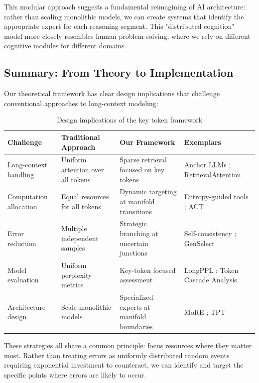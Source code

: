 \documentclass{article}
\begin{document}
This modular approach suggests a fundamental reimagining of AI architecture: rather than scaling monolithic models, we can create systems that identify the appropriate expert for each reasoning segment. This "distributed cognition" model more closely resembles human problem-solving, where we rely on different cognitive modules for different domains.

\subsection{Summary: From Theory to Implementation}

Our theoretical framework has clear design implications that challenge conventional approaches to long-context modeling:

\begin{table}[ht]
\caption{Design implications of the key token framework}
\centering
\small
\begin{tabular}{p{2.6cm}p{3cm}p{3cm}p{3.5cm}}
\toprule
\textbf{Challenge} & \textbf{Traditional Approach} & \textbf{Our Framework} & \textbf{Exemplars} \\
\midrule
Long-context handling & Uniform attention over all tokens & Sparse retrieval focused on key tokens & Anchor LLMs \citep{pang2024anchor}; RetrievalAttention \citep{liu2024retrieval} \\
\midrule
Computation allocation & Equal resources for all tokens & Dynamic targeting at manifold transitions & Entropy-guided tools \citep{moshkov2025aimo}; ACT \citep{xin2023adaptive} \\
\midrule
Error reduction & Multiple independent samples & Strategic branching at uncertain junctions & Self-consistency \citep{wang2023self}; GenSelect \citep{moshkov2025aimo} \\
\midrule
Model evaluation & Uniform perplexity metrics & Key-token focused assessment & LongPPL \citep{fang2024what}; Token Cascade Analysis \citep{nistar2024token} \\
\midrule
Architecture design & Scale monolithic models & Specialized experts at manifold boundaries & MoRE \citep{si2023mixture}; TPT \citep{costello2025think} \\
\bottomrule
\end{tabular}
\label{tab:implications}
\end{table}

These strategies all share a common principle: focus resources where they matter most. Rather than treating errors as uniformly distributed random events requiring exponential investment to counteract, we can identify and target the specific points where errors are likely to occur.
\end{document}
